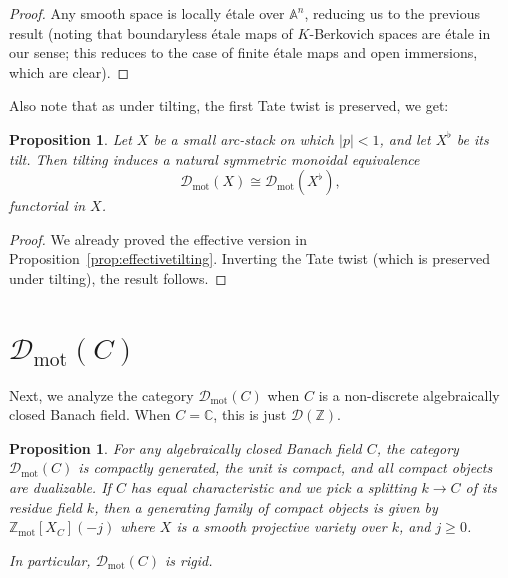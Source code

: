 \documentclass[11pt]{amsart}
\numberwithin{equation}{section}
\numberwithin{theorem}{section}
\newtheorem{proposition}[theorem]{Proposition}
\theoremstyle{definition}
\begin{document}
\begin{proof} Any smooth space is locally \'etale over $\mathbb A^n$, reducing us to the previous result (noting that boundaryless \'etale maps of $K$-Berkovich spaces are \'etale in our sense; this reduces to the case of finite \'etale maps and open immersions, which are clear).
\end{proof}

Also note that as under tilting, the first Tate twist is preserved, we get:

\begin{proposition}\label{prop:fulltilting} Let $X$ be a small arc-stack on which $|p|<1$, and let $X^\flat$ be its tilt. Then tilting induces a natural symmetric monoidal equivalence
\[
\mathcal D_{\mathrm{mot}}(X)\cong \mathcal D_{\mathrm{mot}}(X^\flat),
\]
functorial in $X$.
\end{proposition}

\begin{proof} We already proved the effective version in Proposition~\ref{prop:effectivetilting}. Inverting the Tate twist (which is preserved under tilting), the result follows.
\end{proof}

\section{$\mathcal D_{\mathrm{mot}}(C)$}

Next, we analyze the category $\mathcal D_{\mathrm{mot}}(C)$ when $C$ is a non-discrete algebraically closed Banach field. When $C=\mathbb C$, this is just $\mathcal D(\mathbb Z)$.

\begin{proposition}\label{prop:compactgenerationpoint} For any algebraically closed Banach field $C$, the category $\mathcal D_{\mathrm{mot}}(C)$ is compactly generated, the unit is compact, and all compact objects are dualizable. If $C$ has equal characteristic and we pick a splitting $k\to C$ of its residue field $k$, then a generating family of compact objects is given by $\mathbb Z_{\mathrm{mot}}[X_C](-j)$ where $X$ is a smooth projective variety over $k$, and $j\geq 0$.

In particular, $\mathcal D_{\mathrm{mot}}(C)$ is rigid.
\end{proposition}
\end{document}
